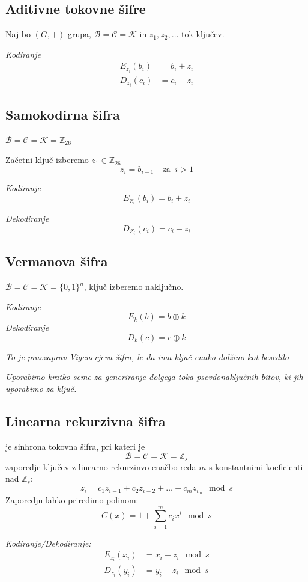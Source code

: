 \begin{multicols}{5}
\subsection*{Aditivne tokovne šifre}
Naj bo $(G, +)$ grupa, $\mathcal{B} = \mathcal{C} = \mathcal{K}$ in $z_1, z_2, \dots$ tok ključev.

\textit{Kodiranje}
\begin{align*}
E_{z_i} (b_i) &= b_i + z_i \\	
D_{z_i} (c_i) &= c_i - z_i
\end{align*}

\subsection*{Samokodirna šifra}
$\mathcal{B} = \mathcal{C} = \mathcal{K} = \mathbb{Z}_{26}$

Začetni ključ izberemo $z_1 \in \mathbb{Z}_{26}$
\[ z_i = b_{i-1} \quad \text{za }\ i > 1 \]

\textit{Kodiranje}
\[ E_{Z_i}(b_i) = b_i + z_i \]

\textit{Dekodiranje}
\[ D_{Z_i}(c_i) = c_i - z_i \]

\subsection*{Vermanova šifra}
$\mathcal{B} = \mathcal{C} = \mathcal{K} = \{0, 1\}^n$, ključ izberemo naključno.

\textit{Kodiranje}
\[ E_k(b) = b \oplus k \]
\textit{Dekodiranje}
\[ D_k(c) = c \oplus k \]

\textit{To je pravzaprav Vigenerjeva šifra, le da ima ključ enako dolžino kot besedilo}

\textit{Uporabimo kratko seme za generiranje dolgega toka psevdonaključnih bitov, ki jih uporabimo za ključ.}

\subsection*{Linearna rekurzivna šifra}
je sinhrona tokovna šifra, pri kateri je
\[ \mathcal{B} = \mathcal{C} = \mathcal{K} = \mathbb{Z}_s\]
zaporedje ključev z linearno rekurzinvo enačbo reda $m$ s konstantnimi koeficienti nad $\mathbb{Z}_s$:
\[ z_i = c_1 z_{i-1} + c_2 z_{i-2} + \dots + c_m z_{i_m} \mod s \]
Zaporedju lahko priredimo polinom:
\[ C(x) = 1 + \sum_{i=1}^m c_i x^i \mod s\]

\textit{Kodiranje/Dekodiranje:}
\begin{align*}
	E_{z_i}(x_i) &= x_i + z_i \mod s \\
	D_{z_i}(y_i) &= y_i - z_i \mod s
\end{align*}


\end{multicols}
